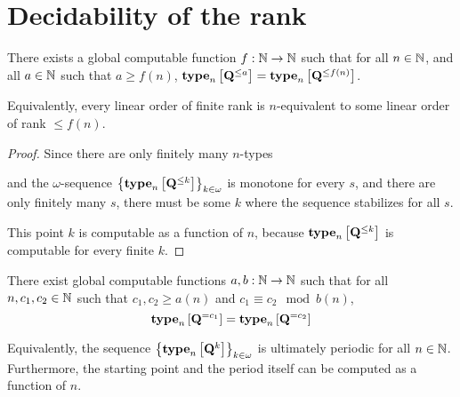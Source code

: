 
\section{Decidability of the rank}

\begin{lemma}
  There exists a global computable function $f : \mathbb{N} \to \mathbb{N}$ such that
  for all $n \in \mathbb{N}$, and all $a \in \mathbb{N}$ such that $a \ge f(n)$,
  $\mathbf{type}_{n} \left[ {\mathbf{Q}^{\le a}} \right] = \mathbf{type}_{n} \left[ {\mathbf{Q}^{\le f(n)}} \right]$.

  Equivalently, every linear order of finite rank is $n$-equivalent to some linear order of rank $\le f(n)$.
\end{lemma}

\begin{proof}
  Since there are only finitely many $n$-types

  and the $\omega$-sequence $\left\{ {\mathbf{type}_{n} \left[ {\mathbf{Q}^{\le k}} \right]} \right\}_{k \in \omega}$
  is monotone for every $s$, and there are only finitely many $s$,
  there must be some $k$ where the sequence stabilizes for all $s$.

  This point $k$ is computable as a function of $n$, because
  $\mathbf{type}_{n} \left[ {\mathbf{Q}^{\le k}} \right]$ is computable for every finite $k$.
\end{proof}

\begin{lemma}
  There exist global computable functions $a, b : \mathbb{N} \to \mathbb{N}$ such that
  for all $n, c_1, c_2 \in \mathbb{N}$ such that $c_1, c_2 \ge a(n)$ and $c_1 \equiv c_2 \mod b(n)$,
  $$\mathbf{type}_{n} \left[ {\mathbf{Q}^{= c_1}} \right] = \mathbf{type}_{n} \left[ {\mathbf{Q}^{= c_2}} \right]$$

  Equivalently, the sequence $\left\{ {\mathbf{type}_{n} \left[ {\mathbf{Q}^{k}} \right]} \right\}_{k \in \omega}$
  is ultimately periodic for all $n \in \mathbb{N}$. Furthermore, the starting point and the period
  itself can be computed as a function of $n$.
\end{lemma}

